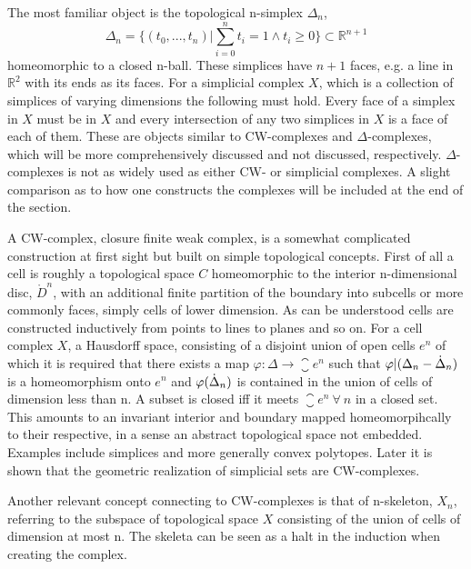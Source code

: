 \documentclass[../../main.tex]{subfiles}
\begin{document}
    The most familiar object is the topological n-simplex $\Delta_n$,
    \begin{equation}
        \Delta_n = \{(t_0, . . . , t_n)  |\sum_{i=0}^{n}t_i=1 \wedge t_i \geq 0\} \subset \mathbb{R}^{n+1}
    \end{equation}
    homeomorphic to a closed n-ball. These simplices have $n+1$ faces, e.g. a line in $\mathbb{R}^2$ with its ends as its faces. For a simplicial complex $X$, which is a collection of simplices of varying dimensions the following must hold. Every face of a simplex in $X$ must be in $X$ and every intersection of any two simplices in $X$ is a face of each of them. These are objects similar to CW-complexes and $\Delta$-complexes, which will be more comprehensively discussed and not discussed, respectively. $\Delta$-complexes is not as widely used as either CW- or simplicial complexes. A slight comparison as to how one constructs the complexes will be included at the end of the section. 
    
    A CW-complex, closure finite weak complex, is a somewhat complicated construction at first sight but built on simple topological concepts. First of all a cell is roughly a topological space $C$ homeomorphic to the interior n-dimensional disc, $\mathring{D}^n$, with an additional finite partition of the boundary into subcells or more commonly faces, simply cells of lower dimension. As can be understood cells are constructed inductively from points to lines to planes and so on. For a cell complex $X$, a Hausdorff space, consisting of a disjoint union of open cells $e^n$ of which it is required that there exists a map $\varphi:\Delta\to\closure{e}^n$ such that $\varphi|(\Delta_n - \dot{\Delta}_n )$ is a homeomorphism onto $e^n$ and $\varphi(\dot{\Delta}_n)$ is contained in the union of cells of dimension less than n. A subset is closed iff it meets $\closure{e}^n\:\forall \:n$ in a closed set. This amounts to an invariant interior and boundary mapped homeomorpihcally to their respective, in a sense an abstract topological space not embedded. Examples include simplices and more generally convex polytopes. Later it is shown that the geometric realization of simplicial sets are CW-complexes.
    
    Another relevant concept connecting to CW-complexes is that of n-skeleton, $X_n$, referring to the subspace of topological space $X$ consisting of the union of cells of dimension at most n. The skeleta can be seen as a halt in the induction when creating the complex. 
\end{document}
